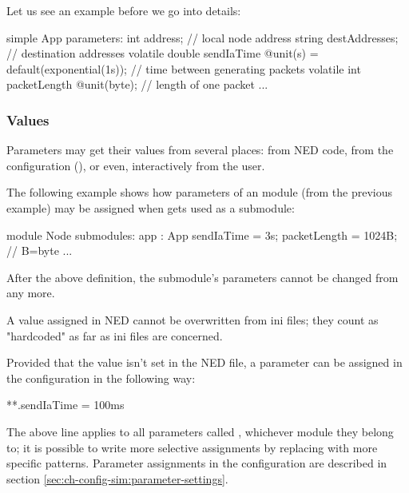 Let us see an example before we go into details:

\begin{ned}
simple App
{
    parameters:
        int address;  // local node address
        string destAddresses;  // destination addresses
        volatile double sendIaTime @unit(s) = default(exponential(1s));
                               // time between generating packets
        volatile int packetLength @unit(byte);  // length of one packet
    ...
}
\end{ned}



\subsubsection{Values}

Parameters may get their values from several places: from NED code, from
the configuration (), or even, interactively from the
user.

The following example shows how parameters of an  module (from the
previous example) may be assigned when  gets used as a submodule:

\begin{ned}
module Node
{
    submodules:
        app : App {
            sendIaTime = 3s;
            packetLength = 1024B; // B=byte
        }
        ...
}
\end{ned}

After the above definition, the  submodule's parameters cannot
be changed from  any more.

\begin{important}
    A value assigned in NED cannot be overwritten from ini files; they
    count as "hardcoded" as far as ini files are concerned.
\end{important}

Provided that the value isn't set in the NED file, a parameter can be assigned
in the configuration in the following way:

\begin{inifile}
**.sendIaTime = 100ms
\end{inifile}

The above line applies to all parameters called , whichever
module they belong to; it is possible to write more selective assignments
by replacing \ttt{**} with more specific patterns. Parameter assignments in
the configuration are described in section
\ref{sec:ch-config-sim:parameter-settings}.

